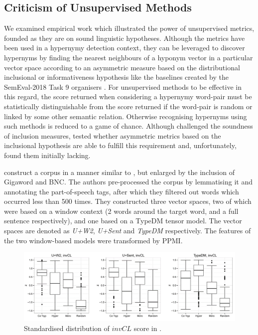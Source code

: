 \subsection{Criticism of Unsupervised Methods}
We examined empirical work which illustrated the power of unsupervised metrics, founded as they are on sound linguistic hypotheses.  Although the metrics have been used in a hypernymy detection context, they can be leveraged to discover hypernyms by finding the nearest neighbours of a hyponym vector in a particular vector space according to an asymmetric measure based on the distributional inclusional or informativeness hypothesis like the baselines created by the SemEval-2018 Task 9 organisers \citep{camacho2018semeval}.  For unsupervised methods to be effective in this regard, the score returned when considering a hypernymy word-pair must be statistically distinguishable from the score returned if the word-pair is random or linked by some other semantic relation.  Otherwise recognising hypernyms using such methods is reduced to a game of chance.  Although \citet{santus2014chasing} challenged the soundness of inclusion measures, \citet{roller2014inclusive} tested whether asymmetric metrics based on the inclusional hypothesis are able to fulfill this requirement and, unfortunately, found them initially lacking.

\citeauthor{roller2014inclusive} construct a corpus in a manner similar to \citep{santus2014chasing}, but enlarged by the inclusion of Gigaword and BNC.  The authors pre-processed the corpus by lemmatising it and annotating the part-of-speech tags, after which they filtered out words which occurred less than 500 times.  They constructed three vector spaces, two of which were based on a window context (2 words around the target word, and a full sentence respectively), and one based on a TypeDM tensor model.  The vector spaces are denoted as \textit{U+W2}, \textit{U+Sent} and \textit{TypeDM} respectively.  The features of the two window-based models were transformed by \ac{PPMI}.

\begin{figure}[ht!] 
  \centering
  \includegraphics[width=1.\linewidth]{images/standardised_distribution_invCL.png}
  \caption[Standardised distribution of $invCL$ score]{Standardised distribution of $invCL$ score in \citep{roller2014inclusive}.}
  \label{fig:standardised_invCL_boxplot}
\end{figure}

